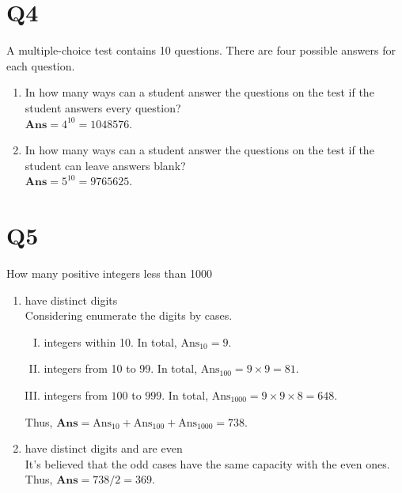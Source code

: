 \documentclass[a4paper,11pt]{article}
\newenvironment{qparts}{\begin{enumerate}[{(}a{)}]}{\end{enumerate}}
\begin{document}
\section*{Q4}
A multiple-choice test contains 10 questions. There are four
possible answers for each question.
\begin{qparts}
    
    \item In how many ways can a student answer the questions on the test if the student answers every question?\\
    $\textbf{Ans}=4^{10}=1048576$.

    \item In how many ways can a student answer the questions on the test if the student can leave answers blank?\\
    $\textbf{Ans}=5^{10}=9765625$.


\end{qparts}

\section*{Q5}
How many positive integers less than 1000
\begin{qparts}
    
    \item have distinct digits\\
    Considering enumerate the digits by cases.
    \begin{enumerate}[I. ]
        \item integers within 10. In total, $\text{Ans}_{10}=9$.
        \item integers from 10 to 99. In total, $\text{Ans}_{100}=9\times 9=81$.
        \item integers from $100$ to $999$. In total, $\text{Ans}_{1000}=
        9\times 9\times 8=648$.
    \end{enumerate}
    Thus, $\textbf{Ans}=\text{Ans}_{10}+\text{Ans}_{100}+\text{Ans}_{1000}=738$.

    \item have distinct digits and are even\\
    It's believed that the odd cases have the same capacity with the even ones. Thus, $\textbf{Ans}=738 / 2=369$.
\end{qparts}
\end{document}
